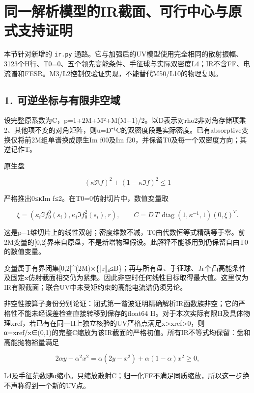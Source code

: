 \documentclass[
  10pt,
  a4paper,
]{article}
\begin{document}
\newpage

\section{同一解析模型的IR截面、可行中心与原式支持证明}\label{ux540cux4e00ux89e3ux6790ux6a21ux578bux7684irux622aux9762ux53efux884cux4e2dux5fc3ux4e0eux539fux5f0fux652fux6301ux8bc1ux660e}

本节针对新增的 \texttt{ir.py}
通路。它与加强后的UV模型使用完全相同的散射振幅、3123个H行、T0=0、五个领先高能条件、手征球与实际双密度L4；IR不含FF、电流谱和FESR。M3/L2控制仅验证实现，不能替代M50/L10的物理复现。

\subsection{1.
可逆坐标与有限非空域}\label{ux53efux9006ux5750ux6807ux4e0eux6709ux9650ux975eux7a7aux57df}

设完整原系数为C，p=1+2M+M²+M(M+1)/2。以D表示对rho2非对角存储项乘2、其他项不变的对角矩阵，则u=D⁻¹C的双密度段是实际密度。已有absorptive变换仅将前2M组单谱换成原生Im
f00及Im f20，并保留T0及每一个双密度方向；其逆记作T。

原生盘

\[
(\kappa\Re f)^2+(1-\kappa\Im f)^2\le1
\]

严格推出0≤κIm f≤2。在T0=0仿射切片中，数值变量取

\[
\xi=(\kappa_i\Im f^0_0(s_i),\kappa_i\Im f^2_0(s_i),r),
\qquad C=D\,T\,\operatorname{diag}(1,\kappa^{-1},1)(0,\xi)^T.
\]

这是p−1维切片上的线性双射；密度维数不减，T0由代数恒等式精确等于零。前2M变量的{[}0,2{]}界来自原盘，不是新增物理假设。此解释不能移用到仍保留自由T0的数值变量。

变量属于有界闭集{[}0,2{]}\^{}(2M)×\{‖r‖₄≤B\}；再与所有盘、手征球、五个凸高能条件及固定x仿射截面相交仍为紧集。因此非空时任何线性目标取得最大值。这里仅为IR有限截面；联合UV中未受矩约束的高能电流谱仍须另论。

非空性按算子身份分别论证：闭式第一谐波证明精确解析IR函数族非空；它的严格性不能未经误差检查直接转移到保存的float64
H。对于本次实际有限H及具体物理xref，若已有在同一H上独立核验的UV严格点满足x\textgreater xref\textgreater0，则α=xref/x∈(0,1)的完整C缩放为该IR截面的严格初值。所有IR不等式均保留：盘和高能抛物裕量满足

\[
2\alpha y-\alpha^2x^2
=\alpha(2y-x^2)+\alpha(1-\alpha)x^2\ge0,
\]

L4及手征范数随α缩小。只缩放散射C；归一化FF不满足同质缩放，所以这一步绝不声称得到一个新的UV点。
\end{document}
